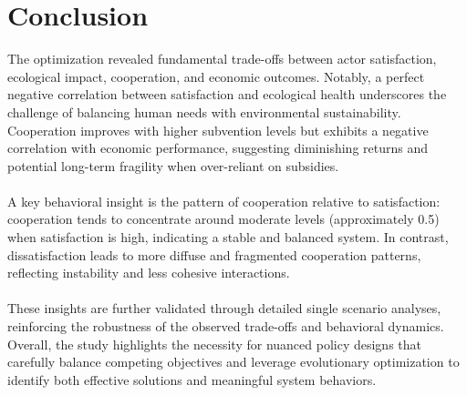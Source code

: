 \documentclass[a4paper, 12pt]{article}
\begin{document}
\section{Conclusion}
The optimization revealed fundamental trade-offs between actor satisfaction, ecological impact, cooperation, and economic outcomes. Notably, a perfect negative correlation between satisfaction and ecological health underscores the challenge of balancing human needs with environmental sustainability. Cooperation improves with higher subvention levels but exhibits a negative correlation with economic performance, suggesting diminishing returns and potential long-term fragility when over-reliant on subsidies.
\\ \\
A key behavioral insight is the pattern of cooperation relative to satisfaction: cooperation tends to concentrate around moderate levels (approximately 0.5) when satisfaction is high, indicating a stable and balanced system. In contrast, dissatisfaction leads to more diffuse and fragmented cooperation patterns, reflecting instability and less cohesive interactions.
\\ \\
These insights are further validated through detailed single scenario analyses, reinforcing the robustness of the observed trade-offs and behavioral dynamics. Overall, the study highlights the necessity for nuanced policy designs that carefully balance competing objectives and leverage evolutionary optimization to identify both effective solutions and meaningful system behaviors.
\end{document}
